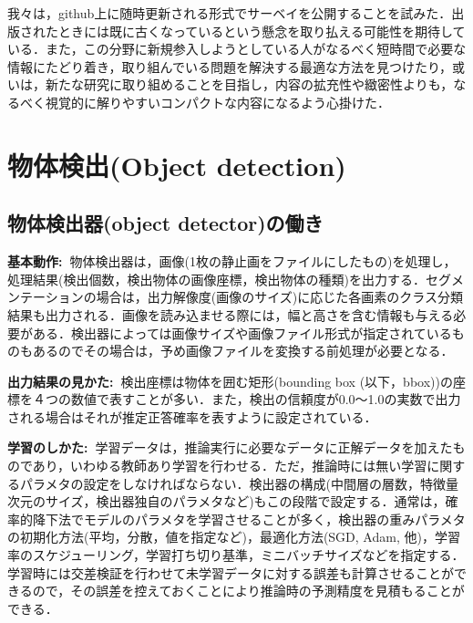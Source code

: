 \documentclass[originalpaper]{jsaiart}     %
\begin{document}
我々は，github上に随時更新される形式でサーベイを公開することを試みた．出版されたときには既に古くなっているという懸念を取り払える可能性を期待している．また，この分野に新規参入しようとしている人がなるべく短時間で必要な情報にたどり着き，取り組んでいる問題を解決する最適な方法を見つけたり，或いは，新たな研究に取り組めることを目指し，内容の拡充性や緻密性よりも，なるべく視覚的に解りやすいコンパクトな内容になるよう心掛けた．

\section{物体検出(Object detection)}
\subsection{物体検出器(object detector)の働き}
{\bf 基本動作:\ }物体検出器は，画像(1枚の静止画をファイルにしたもの)を処理し，処理結果(検出個数，検出物体の画像座標，検出物体の種類)を出力する．セグメンテーションの場合は，出力解像度(画像のサイズ)に応じた各画素のクラス分類結果も出力される．画像を読み込ませる際には，幅と高さを含む情報も与える必要がある．検出器によっては画像サイズや画像ファイル形式が指定されているものもあるのでその場合は，予め画像ファイルを変換する前処理が必要となる．

{\bf 出力結果の見かた:\ }検出座標は物体を囲む矩形(bounding box (以下，bbox))の座標を４つの数値で表すことが多い．また，検出の信頼度が0.0〜1.0の実数で出力される場合はそれが推定正答確率を表すように設定されている．

{\bf 学習のしかた:\ }学習データは，推論実行に必要なデータに正解データを加えたものであり，いわゆる教師あり学習を行わせる．ただ，推論時には無い学習に関するパラメタの設定をしなければならない．検出器の構成(中間層の層数，特徴量次元のサイズ，検出器独自のパラメタなど)もこの段階で設定する．通常は，確率的降下法でモデルのパラメタを学習させることが多く，検出器の重みパラメタの初期化方法(平均，分散，値を指定など)，最適化方法(SGD, Adam, 他)，学習率のスケジューリング，学習打ち切り基準，ミニバッチサイズなどを指定する．学習時には交差検証を行わせて未学習データに対する誤差も計算させることができるので，その誤差を控えておくことにより推論時の予測精度を見積もることができる．
\end{document}
